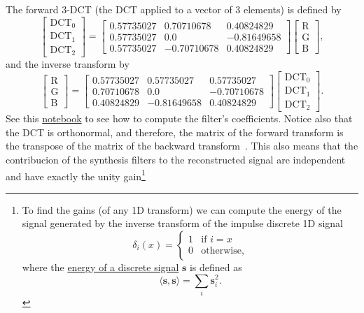 The forward $3$-DCT (the DCT applied to a vector of $3$ elements) is
defined by
\begin{equation}
  \begin{bmatrix}
    \text{DCT}_0 \\
    \text{DCT}_1 \\
    \text{DCT}_2
  \end{bmatrix}
  =
  \begin{bmatrix}
    0.57735027 & 0.70710678 & 0.40824829 \\
    0.57735027 & 0.0 & -0.81649658 \\
    0.57735027 & -0.70710678 & 0.40824829
  \end{bmatrix}
  \begin{bmatrix}
    \text{R} \\
    \text{G} \\
    \text{B}
  \end{bmatrix},
\end{equation}
and the inverse transform by
\begin{equation}
  \begin{bmatrix}
    \text{R} \\
    \text{G} \\
    \text{B}
  \end{bmatrix}
  =
  \begin{bmatrix}
    0.57735027 & 0.57735027 & 0.57735027 \\
    0.70710678 & 0.0 & -0.70710678 \\
    0.40824829 & -0.81649658 & 0.40824829
  \end{bmatrix}
  \begin{bmatrix}
    \text{DCT}_0 \\
    \text{DCT}_1 \\
    \text{DCT}_2
  \end{bmatrix}.
\end{equation}
See this
\href{https://github.com/Sistemas-Multimedia/Sistemas-Multimedia.github.io/blob/master/milestones/06-YUV_compression/color-DCT_matrix.ipynb}{notebook}
to see how to compute the filter's coefficients. Notice also that the
DCT is orthonormal, and therefore, the matrix of the forward transform
is the transpose of the matrix of the backward
transform~\cite{sayood2017introduction}. This also means that the
contribucion of the synthesis filters to the reconstructed signal are
independent and have exactly the unity gain\footnote{To find the gains (of any 1D transform) we can compute the
energy of the signal generated by the inverse transform of the impulse
discrete 1D signal
\begin{equation}
  \delta_{i}(x) = 
  \left\{
  \begin{array}{ll}
    1 & \text{if $i=x$}\\
    0 & \text{otherwise},
  \end{array}
  \right.
\end{equation}
where the
\href{https://en.wikipedia.org/wiki/Energy_(signal_processing)}{energy
  of a discrete signal} ${\mathbf s}$ is defined as
\begin{equation}
  \langle {\mathbf s}, {\mathbf s} \rangle =  \sum_{i}{{\mathbf s}_i^2}.
\end{equation}
}

